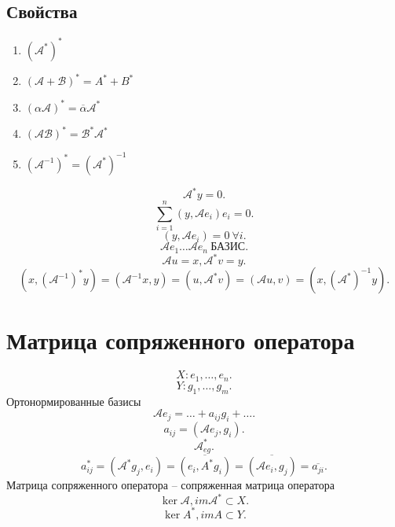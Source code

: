 \documentclass{scrartcl}
\begin{document}
\subsection{Свойства}
\begin{enumerate}
    \item $(\mathcal{A}^{*})^{*}$
    \item $ (\mathcal{A} + \mathcal{B})^{*} = A^{*} + B^{*}$ 
    \item $(\alpha \mathcal{A})^{*} = \overline{\alpha} \mathcal{A}^{*}$ 
    \item $(\mathcal{A} \mathcal{B})^{*} = \mathcal{B}^{*} \mathcal{A}^{*}$ 
    \item $(\mathcal{A}^{-1})^{*} = (\mathcal{A}^{*})^{-1}$
\end{enumerate}
\[
    \mathcal{A}^{*} y = 0
.\] 
\[
    \sum_{i = 1}^{n} (y,\mathcal{A} e_{i}) e_{i} = 0
.\] 
\[
    (y,\mathcal{A} e_{i}) = 0 ~ \forall i
.\] 
\[
    \mathcal{A}e_1 \dots \mathcal{A}e_{n} ~\text{БАЗИС}
.\] 
\[
    \mathcal{A} u = x, \mathcal{A}^{*} v = y
.\] 
\[
    (x,(\mathcal{A}^{-1})^{*}y) = (\mathcal{A}^{-1}x,y) = (u,\mathcal{A}^{*}v) =
    (\mathcal{A} u ,v) = (x,(\mathcal{A}^{*})^{-1} y )
.\] 
\section{Матрица сопряженного оператора}
\[
X:e_1,\dots,e_{n}
.\] 
\[
Y:g_1,\dots,g_{m}
.\] 
Ортонормированные базисы
\[
    \mathcal{A} e_{j} = \dots + a_{ij} g_{i} + \dots
.\] 
\[
    a_{ij} = (\mathcal{A} e_{j},g_{i})
.\] 
\[
    \mathcal{A}^{*}_{eg}
.\] 
\[
    a^{*}_{ij} = (\mathcal{A}^{*} g_{j},e_{i}) = \overline{(e_{i},A^{*} g_{i})} =
    \overline{(\mathcal{A} e_{i},g_{j})} = \overline{a_{ji}}
.\] 
Матрица сопряженного оператора -- сопряженная матрица оператора
\[
    \ker \mathcal{A}, im \mathcal{A} ^{*} \subset X
.\] 
\[
\ker A^{*},im A \subset Y
.\] 
\end{document}
